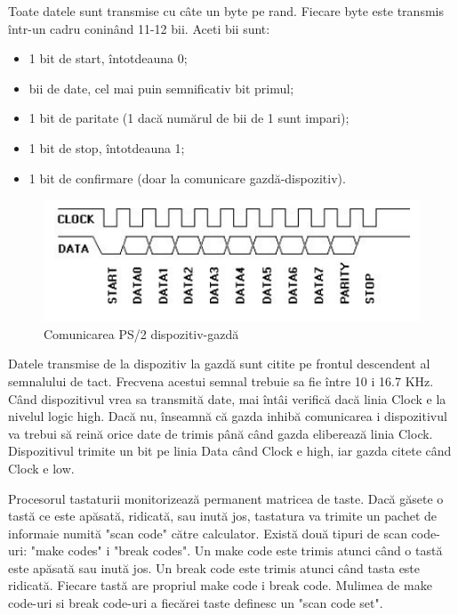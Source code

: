 \documentclass[a4paper,11pt,romanian]{article}
\begin{document}
{{Toate datele sunt transmise cu c\^{a}te un byte pe rand. Fiecare byte este transmis \^{i}ntr-un cadru conin\^{a}nd 11-12 bii. Aceti bii sunt:
\begin{itemize}
\item 1 bit de start, \^{i}ntotdeauna 0;
\item bii de date, cel mai puin semnificativ bit primul;
\item 1 bit de paritate (1 dac\u{a} num\u{a}rul de bii de 1 sunt impari);
\item 1 bit de stop, \^{i}ntotdeauna 1;
\item 1 bit de confirmare (doar la comunicare gazd\u{a}-dispozitiv).
\end{itemize}
\begin{figure}
  \begin{center}
   \includegraphics[scale=0.5]{ps2protocol.png}
   \caption{Comunicarea PS/2 dispozitiv-gazd\u{a}}
   \label{fig:ps2protocol}
  \end{center}
 \end{figure}

Datele transmise de la dispozitiv la gazd\u{a}  sunt citite pe frontul descendent al semnalului de tact. Frecvena acestui semnal trebuie sa fie \^{i}ntre 10 i 16.7 KHz. C\^{a}nd dispozitivul vrea sa transmit\u{a} date, mai \^{i}nt\^{a}i verific\u{a} dac\u{a} linia Clock e la nivelul logic high. Dac\u{a} nu, \^{i}nseamn\u{a} c\u{a} gazda inhib\u{a} comunicarea i dispozitivul va trebui s\u{a} rein\u{a} orice date de trimis p\^{a}n\u{a} c\^{a}nd gazda elibereaz\u{a} linia Clock. Dispozitivul trimite un bit pe linia Data c\^{a}nd Clock e high, iar gazda citete c\^{a}nd Clock e low.}

\small{Procesorul tastaturii monitorizeaz\u{a} permanent matricea de taste. Dac\u{a} g\u{a}sete o tast\u{a} ce este ap\u{a}sat\u{a}, ridicat\u{a}, sau inut\u{a} jos, tastatura va trimite un pachet de informaie numit\u{a} "scan code" c\u{a}tre calculator. Exist\u{a} dou\u{a} tipuri de scan code-uri: "make codes" i "break codes". Un make code este trimis atunci c\^{a}nd o tast\u{a} este ap\u{a}sat\u{a} sau inut\u{a} jos. Un break code este trimis atunci c\^{a}nd tasta este ridicat\u{a}. Fiecare tast\u{a} are propriul make code i break code. Mulimea de make code-uri si break code-uri a fiec\u{a}rei taste definesc un "scan code set". ~\cite{misc:ps2}}

}
\end{document}

